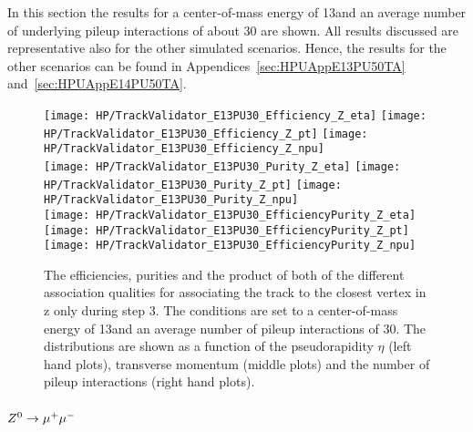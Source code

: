 In this section the results for a center-of-mass energy of 13\TeV and an average number of underlying pileup interactions of about 30 are shown. All results discussed are representative also for the other simulated scenarios. Hence, the results for the other scenarios can be found in Appendices~\ref{sec:HPUAppE13PU50TA} and~\ref{sec:HPUAppE14PU50TA}.

\begin{figure}[h!t]
  \centering
  \texttt{[image: HP/TrackValidator\_E13PU30\_Efficiency\_Z\_eta]}
  \texttt{[image: HP/TrackValidator\_E13PU30\_Efficiency\_Z\_pt]}
  \texttt{[image: HP/TrackValidator\_E13PU30\_Efficiency\_Z\_npu]}
   \\
  \texttt{[image: HP/TrackValidator\_E13PU30\_Purity\_Z\_eta]}
  \texttt{[image: HP/TrackValidator\_E13PU30\_Purity\_Z\_pt]}
  \texttt{[image: HP/TrackValidator\_E13PU30\_Purity\_Z\_npu]}
   \\
  \texttt{[image: HP/TrackValidator\_E13PU30\_EfficiencyPurity\_Z\_eta]}
  \texttt{[image: HP/TrackValidator\_E13PU30\_EfficiencyPurity\_Z\_pt]}
  \texttt{[image: HP/TrackValidator\_E13PU30\_EfficiencyPurity\_Z\_npu]}
  \caption[Efficiencies, purities and their product of the different qualities of the association map with associating to the closest vertex in z only during step 3 with 13\TeV and PU=30]{The efficiencies, purities and the product of both of the different association qualities for associating the track to the closest vertex in z only during step 3. The conditions are set to a center-of-mass energy of 13\TeV and an average number of pileup interactions of 30. The distributions are shown as a function of the pseudorapidity $\eta$ (left hand plots), transverse momentum (middle plots) and the number of pileup interactions (right hand plots). \label{plot:HPUTAE13PU30ZtomumuQualZ}}
\end{figure}

\subsubsection{${Z^{0}}\rightarrow\mu^+\mu^-$ \label{sec:HPUTAE13PU30Ztomumu}}


